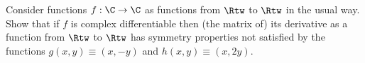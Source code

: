 Consider functions $f:\C\rightarrow \C$ as functions from $\Rtw$ to
$\Rtw$ in the usual way. Show that if $f$ is complex differentiable
then (the matrix of) its derivative as a function from $\Rtw$ to
$\Rtw$ has symmetry properties not satisfied by the functions
$g(x,y)\equiv (x,-y)$ and $h(x,y)\equiv (x,2y)$. 
